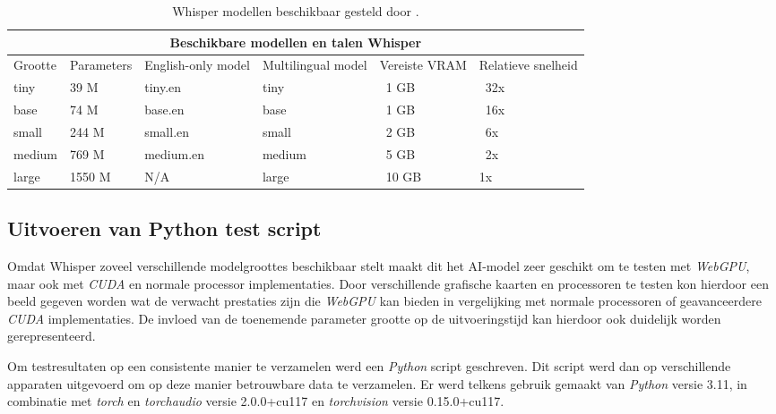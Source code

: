 \begin{table}[b]
    \begin{tabular}{ |p{1.6cm}|p{2.5cm}|p{2.7cm}|p{2.7cm}|p{1.9cm}|p{1.8cm}|  }
        \hline
        \multicolumn{6}{|c|}{Beschikbare modellen en talen Whisper} \\
        \hline
            Grootte& Parameters & English-only model & Multilingual model & Vereiste VRAM & Relatieve snelheid\\
        \hline
            tiny&       39 M    &tiny.en    & tiny& ~1 GB& ~32x     \\
            base &      74 M	&base.en    & base & ~1 GB & ~16x   \\
            small &     244 M	&small.en   & small & ~2 GB & ~6x   \\
            medium &    769 M	&medium.en  & medium & ~5 GB & ~2x  \\
            large &     1550 M	&N/A        & large & ~10 GB& 	1x  \\
        \hline
    \end{tabular}
    \caption{Whisper modellen beschikbaar gesteld door \textcite{OpenAI2023}.}
    \label{tab:OpenAIWhisperModels}
\end{table}

\break{}

\subsection{Uitvoeren van Python test script}

Omdat Whisper zoveel verschillende modelgroottes beschikbaar stelt maakt dit het AI-model zeer geschikt om te testen met \textit{WebGPU}, maar ook met \textit{CUDA} en normale processor implementaties. Door verschillende grafische kaarten en processoren te testen kon hierdoor een beeld gegeven worden wat de verwacht prestaties zijn die \textit{WebGPU} kan bieden in vergelijking met normale processoren of geavanceerdere \textit{CUDA} implementaties. De invloed van de toenemende parameter grootte op de uitvoeringstijd kan hierdoor ook duidelijk worden gerepresenteerd.

\bigbreak{}

Om testresultaten op een consistente manier te verzamelen werd een \textit{Python} script geschreven. Dit script werd dan op verschillende apparaten uitgevoerd om op deze manier betrouwbare data te verzamelen. Er werd telkens gebruik gemaakt van \textit{Python} versie 3.11, in combinatie met \textit{torch} en \textit{torchaudio} versie 2.0.0+cu117 en \textit{torchvision} versie 0.15.0+cu117.

